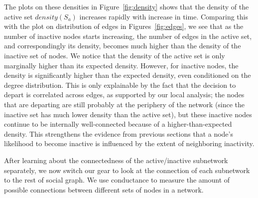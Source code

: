 \documentclass[phd,tocprelim]{cornell}
\renewcommand{\caption}[1]{\singlespacing\hangcaption{#1}\normalspacing}
\begin{document}

The plots on these densities in Figure~\ref{fig:density} shows that the density
of the active set $density(S_a)$ increases rapidly with increase in
time. Comparing this with the plot on distribution of edges in
Figures~\ref{fig:edges}, we see that as the number of inactive nodes starts
increasing, the number of edges in the active set, and correspondingly its
density, becomes much higher than the density of the inactive set of nodes. We
notice that the density of the active set is only marginally higher than its
expected density. However, for inactive nodes, the density is significantly
higher than the expected density, even conditioned on the degree
distribution. This is only explainable by the fact that the decision to depart
is correlated across edges, as supported by our local analysis; the nodes that
are departing are still probably at the periphery of the network (since the
inactive set has much lower density than the active set), but these inactive
nodes continue to be internally well-connected because of a higher-than-expected
density. This strengthens the evidence from previous sections that a node's
likelihood to become inactive is influenced by the extent of neighboring
inactivity.

After learning about the connectedness of the active/inactive subnetwork separately, we now switch our gear to look at the connection of each subnetwork to the rest of social graph. We use conductance to measure the amount of possible connections between different sets of nodes in a network. 
\end{document}
